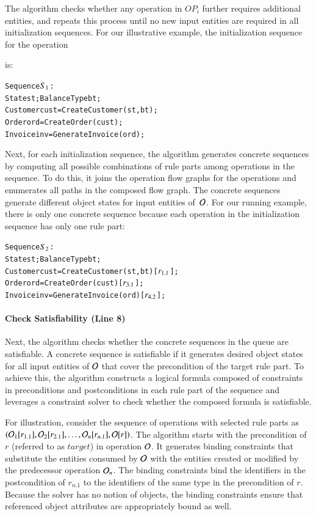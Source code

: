 The algorithm checks whether any operation in $OP_i$ further requires additional
entities, and repeats this process until no new input entities are required in
all initialization sequences.  For our illustrative example, the initialization
sequence for the operation \subject{GenerateInvoice} is:

\vspace*{-4pt}
{\scriptsize
\begin{alltt}
 Sequence \(S\sb{1}\):
 State st; BalanceType bt;
 Customer cust = CreateCustomer(st, bt);  
 Order ord = CreateOrder(cust);
 Invoice inv = GenerateInvoice(ord);  
\end{alltt}
}
\vspace*{-5pt}

Next, for each initialization sequence, the algorithm generates concrete
sequences by computing all possible combinations of rule parts among operations
in the sequence. To do this, it joins the operation flow graphs for the
operations and enumerates all paths in the composed flow graph. The concrete
sequences generate different object states for input entities of~${\cal O}$. For
our running example, there is only one concrete sequence because each operation
in the initialization sequence has only one rule part:

\vspace*{-4pt}
{\scriptsize
\begin{alltt}
 Sequence \(S\sb{2}\):
 State st; BalanceType bt;
 Customer cust = CreateCustomer(st, bt) [\(r\sb{1.1}\)];
 Order ord = CreateOrder(cust) [\(r\sb{3.1}\)];	
 Invoice inv = GenerateInvoice(ord) [\(r\sb{4.2}\)];  
\end{alltt}
}
\vspace*{-5pt}

\vskip -7pt
\paragraph*{Check Satisfiability (Line 8)} Next, the algorithm checks whe\-ther 
the concrete sequences in the queue are satisfiable. A concrete sequence is
satisfiable if it generates desired object states for all input entities of
${\cal O}$ that cover the precondition of the target rule part. To achieve this,
the algorithm constructs a logical formula composed of constraints in
preconditions and postconditions in each rule part of the sequence and leverages
a constraint solver to check whether the composed formula is satisfiable.

For illustration, consider the sequence of operations with selected rule parts
as $({\cal O}_1 [r_{1.1}], {\cal O}_2 [r_{2.1}], \ldots, {\cal O}_n [r_{n.1}],
{\cal O} [r])$.  The algorithm starts with the precondition of $r$ (referred to
as $target$) in operation ${\cal O}$.  It generates binding constraints that
substitute the entities consumed by ${\cal O}$ with the entities created or
modified by the predecessor operation ${\cal O}_n$. The binding constraints bind
the identifiers in the postcondition of $r_{n.1}$ to the identifiers of the same
type in the precondition of $r$. Because the solver has no notion of objects,
the binding constraints ensure that referenced object attributes are
appropriately bound as well.

